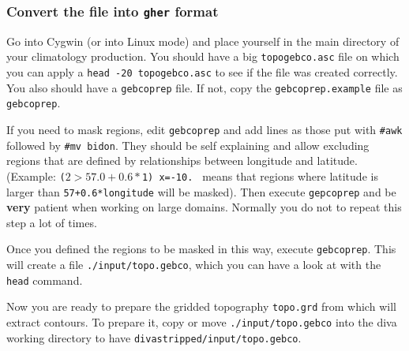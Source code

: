 \subsubsection{Convert the file into \texttt{gher} format}

%
%
%
%

Go into Cygwin (or into Linux mode) and place yourself in the main directory of your climatology production. You should have a big {\tt topogebco.asc} file on which you can apply a {\tt head -20 topogebco.asc} to see if the file was created correctly. You also should have a {\tt gebcoprep} file. If not, copy the {\tt gebcoprep.example} file as {\tt gebcoprep}.

If you need to mask regions, edit {\tt gebcoprep} and add lines as those put with {\tt \#awk} followed by {\tt \#mv bidon}. They should be self explaining and allow excluding regions that are defined by relationships between longitude and latitude. (Example: {\tt ($2 > 57.0+0.6*$1) {x=-10.} } means that regions where latitude is larger than \texttt{57+0.6*longitude} will be masked). Then execute {\tt gepcoprep} and be {\bf very} patient when working on large domains. Normally you do not to repeat this step a lot of times.

Once you defined the regions to be masked in this way, execute {\tt gebcoprep}. This will create a file
{\tt ./input/topo.gebco}, which you can have a look at with the {\tt head} command.

Now you are ready to prepare the gridded topography {\tt topo.grd} from which \diva will extract contours. To prepare it,
copy or move {\tt ./input/topo.gebco} into the diva working directory to have {\tt divastripped/input/topo.gebco}.

